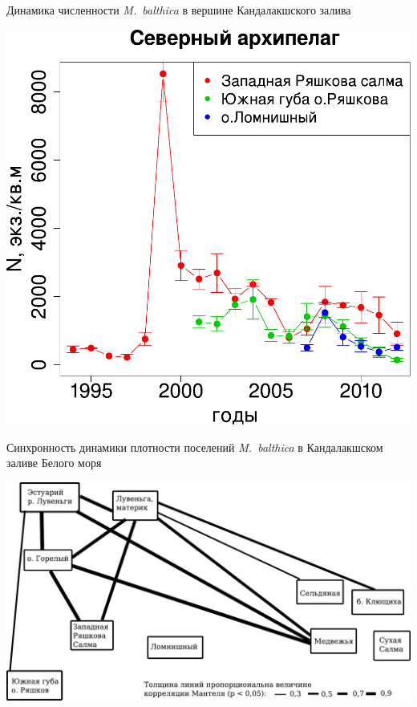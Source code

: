 \documentclass{beamer}
\begin{document}
\begin{frame}{Динамика численности {\it M.~balthica} в вершине Кандалакшского залива}
\begin{minipage}[t]{.49\linewidth}
\begin{center}
			\includegraphics[width=\textwidth]{N2_dynamic_North_big1.pdf}
		\end{center}
	\end{minipage}
\end{frame}

\begin{frame}{Синхронность динамики плотности поселений {\it M.~balthica} в Кандалакшском заливе Белого моря}
		\begin{center}
			\includegraphics[width=\textwidth]{mantel1.pdf}
		\end{center}
\end{frame}
\end{document}
